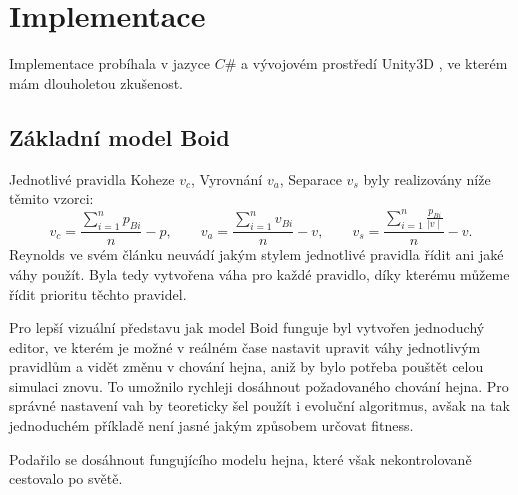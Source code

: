 \section{Implementace}
Implementace probíhala v jazyce $C\#$ a vývojovém prostředí Unity3D \cite{Unity}, ve kterém mám dlouholetou zkušenost. 
\subsection{Základní model Boid}
Jednotlivé pravidla Koheze $v_c$, Vyrovnání $v_a$, Separace $v_s$ byly realizovány níže těmito vzorci: 
\begin{equation}
v_c = \frac{ \sum\limits_{i=1}^n{p_{Bi} } }{ n } - p, \qquad
v_a = \frac{ \sum\limits_{i=1}^n{v_{Bi} } }{ n } - v, \qquad
v_s = \frac{ \sum\limits_{i=1}^n{ \frac{p_{Bi}}{\mid v \mid}  } }{ n } - v.
\end{equation}
Reynolds ve svém článku neuvádí jakým stylem jednotlivé pravidla řídit ani jaké váhy použít. Byla tedy vytvořena váha pro každé pravidlo, díky kterému můžeme řídit prioritu těchto pravidel. 
\par
Pro lepší vizuální představu jak model Boid funguje byl vytvořen jednoduchý editor, ve kterém je možné v reálném čase nastavit upravit váhy jednotlivým pravidlům a vidět změnu v chování hejna, aniž by bylo potřeba pouštět celou simulaci znovu. To umožnilo rychleji dosáhnout požadovaného chování hejna. Pro správné nastavení vah by teoreticky šel použít i evoluční algoritmus, avšak na tak jednoduchém příkladě není jasné jakým způsobem určovat fitness. 
\par
Podařilo se dosáhnout fungujícího modelu hejna, které však nekontrolovaně cestovalo po světě. 

